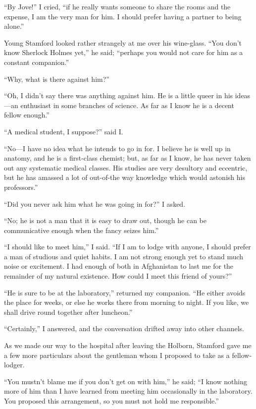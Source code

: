 \documentclass[12pt,english,oneside]{book}
\newcommand{\mdsh}[1]{\mbox{#1}\linebreak[1]}
\begin{document}
{}``By Jove!'' I cried, {}``if he really wants someone to share
the rooms and the expense, I am the very man for him. I should prefer
having a partner to being alone.''

Young Stamford looked rather strangely at me over his wine-glass.
{}``You don't know Sherlock Holmes yet,'' he said; {}``perhaps
you would not care for him as a constant companion.''

{}``Why, what is there against him?''

{}``Oh, I didn't say there was anything against him. He is a little
queer in his ideas\mdsh{---}an enthusiast in some branches of science.
As far as I know he is a decent fellow enough.''

{}``A medical student, I suppose?'' said I.

{}``No\mdsh{---}I have no idea what he intends to go in for. I believe
he is well up in anatomy, and he is a first-class chemist; but, as
far as I know, he has never taken out any systematic medical classes.
His studies are very desultory and eccentric, but he has amassed a
lot of out-of-the way knowledge which would astonish his professors.''

{}``Did you never ask him what he was going in for?'' I asked.

{}``No; he is not a man that it is easy to draw out, though he can
be communicative enough when the fancy seizes him.''

{}``I should like to meet him,'' I said. {}``If I am to lodge with
anyone, I should prefer a man of studious and quiet habits. I am not
strong enough yet to stand much noise or excitement. I had enough
of both in Afghanistan to last me for the remainder of my natural
existence. How could I meet this friend of yours?''

{}``He is sure to be at the laboratory,'' returned my companion.
{}``He either avoids the place for weeks, or else he works there
from morning to night. If you like, we shall drive round together
after luncheon.''

{}``Certainly,'' I answered, and the conversation drifted away into
other channels.

As we made our way to the hospital after leaving the Holborn, Stamford
gave me a few more particulars about the gentleman whom I proposed
to take as a fellow-lodger.

{}``You mustn't blame me if you don't get on with him,'' he said;
{}``I know nothing more of him than I have learned from meeting him
occasionally in the laboratory. You proposed this arrangement, so
you must not hold me responsible.''
\end{document}
